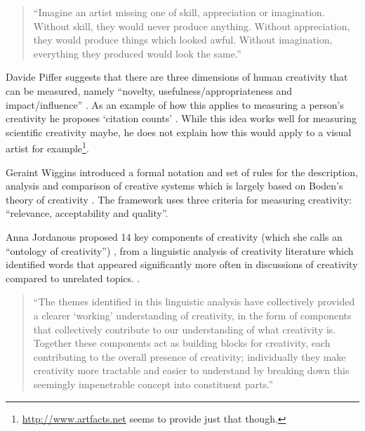 \begin{quote}
  ``Imagine an artist missing one of skill, appreciation or imagination. Without skill, they would never produce anything. Without appreciation, they would produce things which looked awful. Without imagination, everything they produced would look the same.'' \autocite{Colton2008a}
\end{quote}

Davide Piffer suggests that there are three dimensions of human creativity that can be measured, namely ``novelty, usefulness/appropriateness and impact/influence'' \citeyear[p.258-259]{Piffer2012}. As an example of how this applies to measuring a person's creativity he proposes `citation counts' \autocite[p.261]{Piffer2012}. While this idea works well for measuring scientific creativity maybe, he does not explain how this would apply to a visual artist for example\footnote{\url{http://www.artfacts.net} seems to provide just that though.}.

Geraint Wiggins introduced a formal notation and set of rules for the description, analysis and comparison of creative systems \citeyear{Wiggins2006} which is largely based on Boden's theory of creativity \citeyear{Boden2003}. The framework uses three criteria for measuring creativity: ``relevance, acceptability and quality''.

Anna Jordanous proposed 14 key components of creativity (which she calls an  ``ontology of creativity'') \citeyear[p.104-120]{Jordanous2012}, from a linguistic analysis of creativity literature which identified words that appeared significantly more often in discussions of creativity compared to unrelated topics. \citeyear[p.120]{Jordanous2012}.

\begin{quote}
  ``The themes identified in this linguistic analysis have collectively provided a clearer `working' understanding of creativity, in the form of components that collectively contribute to our understanding of what creativity is. Together these components act as building blocks for creativity, each contributing to the overall presence of creativity; individually they make creativity more tractable and easier to understand by breaking down this seemingly impenetrable concept into constituent parts.'' \autocite[p.120]{Jordanous2012}
\end{quote}


